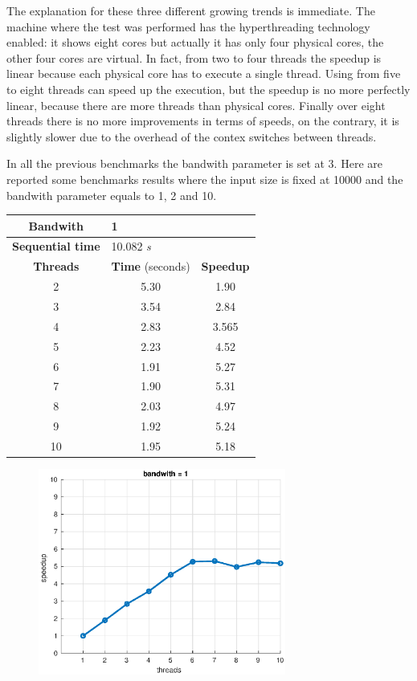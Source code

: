 \documentclass[10pt,twocolumn,letterpaper]{article}
\begin{document}
The explanation for these three different growing trends is immediate. The machine where the test was performed has the hyperthreading technology enabled: it shows eight cores but actually it has only four physical cores, the other four cores are virtual. In fact, from two to four threads the speedup is linear because each physical core has to execute a single thread. Using from five to eight threads can speed up the execution, but the speedup is no more perfectly linear, because there are more threads than physical cores. Finally over eight threads there is no more improvements in terms of speeds, on the contrary, it is slightly slower due to the overhead of the contex switches between threads.

In all the previous benchmarks the bandwith parameter is set at 3. Here are reported some benchmarks results where the input size is fixed at 10000 and the bandwith parameter equals to 1, 2 and 10.

\begin{table}[H]
\centering
\begin{tabular}{ccc}
\hline
\textbf{Bandwith} & \multicolumn{2}{l}{1} \\
\hline
\textbf{Sequential time} & \multicolumn{2}{l}{10.082 \textit{s}} \\
\hline
\textbf{Threads} & \textbf{Time} (seconds) & \textbf{Speedup} \\
\hline
2 & 5.30  & 1.90 \\
3 & 3.54 & 2.84 \\
4 & 2.83 & 3.565 \\
5 & 2.23 & 4.52 \\
6 & 1.91 & 5.27 \\
7 & 1.90 & 5.31 \\
8 & 2.03 & 4.97 \\
9 & 1.92 & 5.24 \\
10 & 1.95 & 5.18 \\
\hline
\end{tabular}
\end{table}

\begin{figure}[H]
\centering
\includegraphics[width=3.2in]{fig/speedup1b.eps}
\end{figure}
\end{document}
